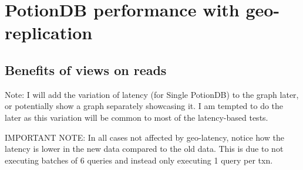 \documentclass[sigplan,10pt]{acmart}
\begin{document}
\section{PotionDB performance with geo-replication}

\subsection{Benefits of views on reads}

Note: I will add the variation of latency (for Single PotionDB) to the graph later, or potentially show a graph separately showcasing it.
I am tempted to do the later as this variation will be common to most of the latency-based tests.

IMPORTANT NOTE: In all cases not affected by geo-latency, notice how the latency is lower in the new data compared to the old data.
This is due to not executing batches of 6 queries and instead only executing 1 query per txn.
\end{document}
